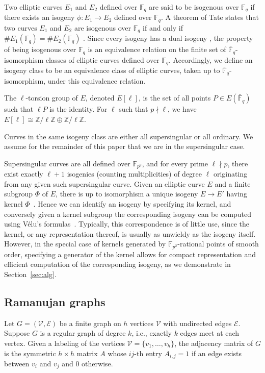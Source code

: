 \documentclass[jmc]{degruyter-journal-a}
\theoremstyle{definition}
\newcommand{\ZZ}{{\mathbb{Z}}}
\newcommand{\FF}{{\mathbb{F}}}
\newcommand{\VV}{{\mathcal{V}}}
\newcommand{\EE}{{\mathcal{E}}}
\begin{document}
Two elliptic curves $E_1$ and $E_2$ defined over $\FF_q$ are said to
be isogenous over $\FF_q$ if there exists an isogeny $\phi\colon E_1
\to E_2$ defined over $\FF_q$. A theorem of Tate states that
two curves $E_1$ and $E_2$ are isogenous over $\FF_q$ if and only if
$\#E_1(\FF_q) = \#E_2(\FF_q)$ \cite[$\S$3]{Tate}. Since every isogeny
has a dual isogeny \cite[III.6.1]{Sil}, the property of being
isogenous over $\FF_q$ is an equivalence relation on the finite set of
$\bar{\FF}_q$-isomorphism classes of elliptic curves defined over
$\FF_q$.  Accordingly, we define an isogeny class to be an equivalence
class of elliptic curves, taken up to $\bar{\FF}_q$-isomorphism, under
this equivalence relation.

The $\ell$-torsion group of $E$, denoted $E[\ell]$, is the set of all
points $P \in E(\bar{\FF}_q)$ such that $\ell P$ is the identity. For
$\ell$ such that $p\nmid \ell$, we have $E[\ell] \cong \ZZ/\ell\ZZ \oplus
\ZZ/\ell\ZZ.$

Curves in the same isogeny class are either all supersingular or all
ordinary. 
We assume for the remainder of this paper that
we are in the supersingular case.

Supersingular curves are all defined over $\FF_{p^2}$, and for every
prime $\ell \nmid p$, there exist exactly $\ell+1$ isogenies (counting
multiplicities) of degree $\ell$ originating from any given such
supersingular curve.
Given an elliptic curve $E$ and a finite subgroup $\Phi$ of $E$, there
is up to isomorphism a unique isogeny $E \to E'$ having kernel
$\Phi$~\cite[III.4.12]{Sil}. Hence we can identify an isogeny by
specifying its kernel, and conversely given a kernel subgroup the
corresponding isogeny can be computed using V\'elu's
formulas~\cite{Velu}. Typically, this correspondence is of little use,
since the kernel, or any representation thereof, is usually as
unwieldy as the isogeny itself. However, in the special case of
kernels generated by $\FF_{p^2}$-rational points of smooth order,
specifying a generator of the kernel allows for compact representation
and efficient computation of the corresponding isogeny, as we
demonstrate in Section~\ref{sec:alg}.


\subsection{Ramanujan graphs}\label{ram_graph} 

Let $G = (\mathcal{V},\EE)$ be a finite graph on $h$ vertices $\VV$
with undirected edges $\EE$.  Suppose $G$ is a regular graph of degree
$k$, i.e., exactly $k$ edges meet at each vertex. Given a
labeling of the vertices $\VV = \{v_1,\ldots , v_h\}$, the adjacency
matrix of $G$ is the symmetric $h\times h$ matrix $A$ whose $ij$-th
entry $A_{i,j} = 1$ if an edge exists between $v_i$ and $v_j$ and 0
otherwise.
\end{document}
